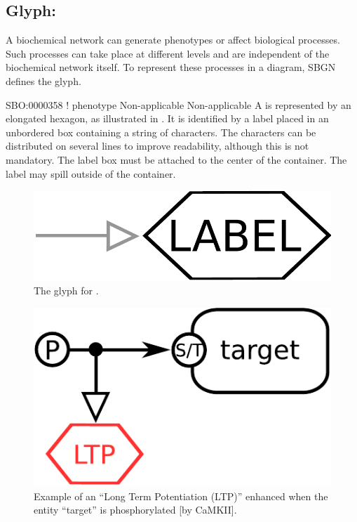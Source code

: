 
\color{ForestGreen}

\subsection{Glyph: }
\label{sec:phenotype}

A biochemical network can generate phenotypes or affect biological
processes.  Such processes can take place at different levels and are
independent of the biochemical network itself.  To represent these
processes in a diagram, SBGN defines the  glyph.

\begin{glyphDescription}

\glyphSboTerm SBO:0000358 ! phenotype
\glyphOrigin Non-applicable
\glyphTarget Non-applicable
\glyphEndPoint A  is represented by an elongated
hexagon, as illustrated in . It is identified by a label placed in an
unbordered box containing a string of characters.  The characters can be
distributed on several lines to improve readability, although this is not
mandatory.  The label box must be attached to the center of the
 container.  The label may spill outside of the container.

\end{glyphDescription}
 
\begin{figure}[H]
  \centering
  \includegraphics[scale = 0.3]{images/phenotype}
  \caption{The \ER glyph for .}
  \label{fig:observable}
\end{figure}

\begin{figure}[H]
  \centering
  \includegraphics[scale = 0.5]{examples/ex-phenotype}
  \caption{Example of an  ``Long Term Potentiation (LTP)'' enhanced when the entity ``target'' is phosphorylated [by CaMKII].}
  \label{fig:ex-phenotype}
\end{figure}

\normalcolor
